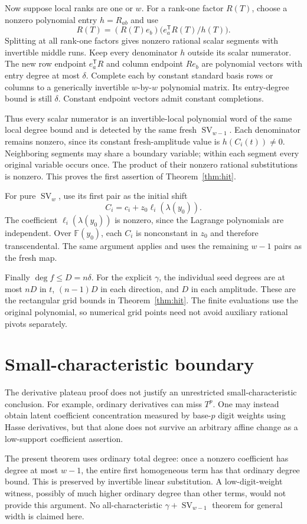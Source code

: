 \documentclass[11pt]{article}
\newcommand{\F}{\mathbb F}
\newcommand{\SV}{\operatorname{SV}}
\begin{document}
Now suppose local ranks are one or \(w\).
For a rank-one factor \(R(T)\), choose a nonzero polynomial entry
\(h=R_{ab}\) and use
\[
 R(T)=(R(T)e_b)\bigl(e_a^{\mathsf T}R(T)/h(T)\bigr).
\]
Splitting at all rank-one factors gives nonzero rational scalar
segments with invertible middle runs.
Keep every denominator \(h\) outside its scalar numerator.
The new row endpoint \(e_a^{\mathsf T}R\) and column endpoint
\(Re_b\) are polynomial vectors with entry degree at most \(\delta\).
Complete each by constant standard basis rows or columns to a
generically invertible \(w\)-by-\(w\) polynomial matrix.
Its entry-degree bound is still \(\delta\).
Constant endpoint vectors admit constant completions.

Thus every scalar numerator is an invertible-local polynomial word
of the same local degree bound and is detected by the same fresh
\(\SV_{w-1}\). Each denominator remains nonzero, since its
constant fresh-amplitude value is \(h(C_i(t))\ne0\).
Neighboring segments may share a boundary variable; within each
segment every original variable occurs once.
The product of their nonzero rational substitutions is nonzero.
This proves the first assertion of Theorem~\ref{thm:hit}.

For pure \(\SV_w\), use its first pair as the initial shift
\[
 C_i=c_i+z_0\ell_i(\lambda(y_0)).
\]
The coefficient \(\ell_i(\lambda(y_0))\) is nonzero, since the
Lagrange polynomials are independent.
Over \(\F(y_0)\), each \(C_i\) is nonconstant in \(z_0\) and
therefore transcendental. The same argument applies and uses
the remaining \(w-1\) pairs as the fresh map.

Finally \(\deg f\le D=n\delta\).
For the explicit \(\gamma\), the individual seed degrees are at most
\(nD\) in \(t\), \((n-1)D\) in each direction, and \(D\)
in each amplitude. These are the rectangular grid bounds in
Theorem~\ref{thm:hit}. The finite evaluations use the original
polynomial, so numerical grid points need not avoid auxiliary
rational pivots separately.

\section{Small-characteristic boundary}

The derivative plateau proof does not justify an unrestricted
small-characteristic conclusion. For example, ordinary derivatives
can miss \(T^p\).
One may instead obtain latent coefficient concentration measured by
base-\(p\) digit weights using Hasse derivatives, but that alone
does not survive an arbitrary affine change as a low-support
coefficient assertion.

The present theorem uses ordinary total degree: once a nonzero
coefficient has degree at most \(w-1\), the entire first homogeneous
term has that ordinary degree bound. This is preserved by invertible
linear substitution. A low-digit-weight witness, possibly of much
higher ordinary degree than other terms, would not provide this
argument. No all-characteristic \(\gamma+\SV_{w-1}\) theorem for
general width is claimed here.
\end{document}
